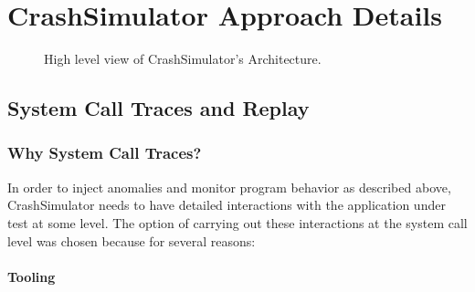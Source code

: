 \section{CrashSimulator Approach Details}
    \begin{figure}[t]
        \center{}
        \caption{High level view of CrashSimulator's Architecture.}
        \label{figure:architecture}
    \end{figure}
    
    \subsection{System Call Traces and Replay}

        \subsubsection{Why System Call Traces?}

        In order to inject anomalies and monitor program behavior as described
        above, CrashSimulator needs to have detailed interactions with the
        application under test at some level.  The option of carrying out these
        interactions at the system call level was chosen because for several
        reasons:

        \paragraph{Tooling}

